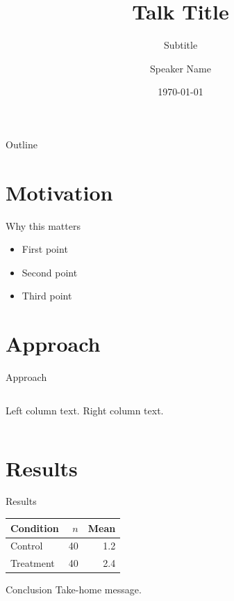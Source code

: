 \documentclass[aspectratio=169]{beamer}
\title{Talk Title}
\subtitle{Subtitle}
\author{Speaker Name}
\institute{Institution}
\date{\today}
\begin{document}
\begin{frame}
  \titlepage
\end{frame}

\begin{frame}{Outline}
  \tableofcontents
\end{frame}

\section{Motivation}
\begin{frame}{Why this matters}
  \begin{itemize}
    \item First point
    \item Second point
    \item Third point
  \end{itemize}
\end{frame}

\section{Approach}
\begin{frame}{Approach}
  \begin{columns}
    Left column text.
    Right column text.
  \end{columns}
\end{frame}

\section{Results}
\begin{frame}{Results}
  \begin{table}
    \begin{tabular}{lrr}
      \toprule
      Condition & $n$ & Mean \\
      \midrule
      Control   & 40  & 1.2  \\
      Treatment & 40  & 2.4  \\
      \bottomrule
    \end{tabular}
  \end{table}
\end{frame}

\begin{frame}{Conclusion}
  Take-home message.
\end{frame}
\end{document}
